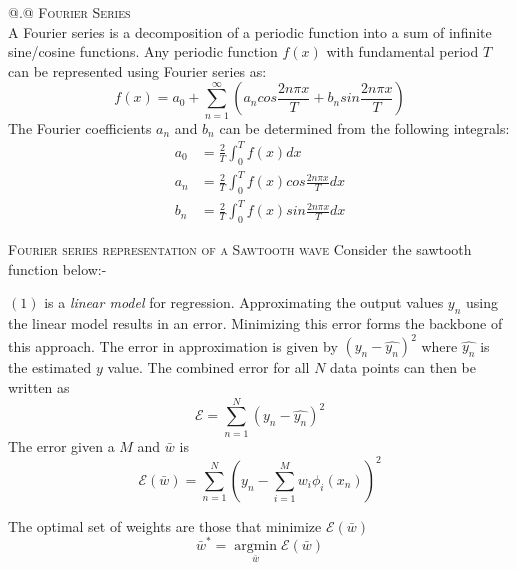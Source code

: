 \documentclass[a4paper,12pt]{article}
\makeatletter
\newcommand*{\rom}[1]{\expandafter\@slowromancap\romannumeral #1@}
\makeatother
\begin{document}
\noindent \rom{2}.\rom{2} \textsc{Fourier Series} \\
\hspace*{5mm} A Fourier series is a decomposition of a periodic function into a sum of infinite sine/cosine functions. Any periodic function $f(x)$ with fundamental period $T$ can be represented using Fourier series as:
\[ f(x) = a_0 + \sum_{n=1}^{\infty} \left( a_n cos \frac{2 n\pi x}{T} + b_n sin \frac{2 n \pi x}{T} \right) \]
The Fourier coefficients $a_n$ and $b_n$ can be determined from the following integrals:
\begin{align}
 a_0 &= \frac{2}{T} \int_{0}^{T} f(x) dx \\
 a_n &= \frac{2}{T} \int_{0}^{T} f(x) cos \frac{2 n\pi x}{T} dx \\ 
 b_n &= \frac{2}{T} \int_{0}^{T} f(x) sin \frac{2 n\pi x}{T} dx 
\end{align}

\textsc{Fourier series representation of a Sawtooth wave}
Consider the sawtooth function below:-


\noindent $(1)$ is a \textit{linear model} for regression. Approximating the output values ${y_n}$ using the linear model results in an error. Minimizing this error forms the backbone of this approach. The error in approximation is given by $(y_n-\hat{y_n})^2$ where $\hat{y_n}$ is the estimated $y$ value. The combined error for all $N$ data points can then be written as
\begin{equation}
 \mathcal{E} = \sum_{n=1}^N (y_n-\hat{y_n})^2
\end{equation} 
The error given a $M$ and $\bar{w}$ is 
\begin{equation}
 \mathcal{E}(\bar{w}) = \sum_{n=1}^N (y_n-\sum_{i=1}^M w_i \phi_i(x_n))^2
\end{equation} 

The optimal set of weights are those that minimize $\mathcal{E}(\bar{w})$
\[ \bar{w}^* = \displaystyle\operatorname*{argmin}_{\bar{w}} \mathcal{E}(\bar{w}) \]
\end{document}
